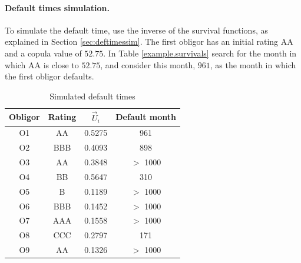 \documentclass[a4paper,12pt,final]{article}
\begin{document}
\paragraph{Default times simulation.} To simulate the default time, use the 
inverse of the survival functions, as explained in Section \ref{sec:deftimessim}.
The first obligor has an initial rating AA and a copula value of $52.75$. 
In Table \ref{example.survivals} search for the month in which AA is close to 
$52.75$, and consider this month, $961$, as the month in which the first obligor 
defaults. 
{\small
\begin{table}[!hbt]
\begin{center}
\begin{tabular}[]{|c|c|c|c|}
Obligor  & Rating & $\vec{U}_i$ & Default month \\
\hline
O1       & AA     &  0.5275     &  961      \\
O2       & BBB    &  0.4093     &  898      \\
O3       & AA     &  0.3848     &  $>$ 1000 \\
O4       & BB     &  0.5647     &  310      \\
O5       & B      &  0.1189     &  $>$ 1000 \\
O6       & BBB    &  0.1452     &  $>$ 1000 \\
O7       & AAA    &  0.1558     &  $>$ 1000 \\
O8       & CCC    &  0.2797     &  171      \\
O9       & AA     &  0.1326     &  $>$ 1000 \\
\end{tabular}
\caption{Simulated default times}
\end{center}
\end{table}
}
\FloatBarrier
\end{document}
